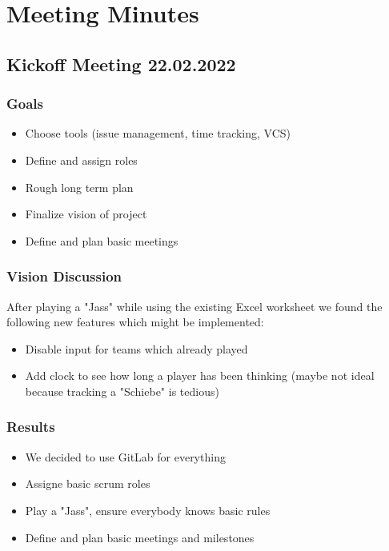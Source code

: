 \chapter{Meeting Minutes}

\section{Kickoff Meeting 22.02.2022}

\subsection{Goals}
\begin{itemize}
    \item Choose tools (issue management, time tracking, VCS)
    \item Define and assign roles
    \item Rough long term plan
    \item Finalize vision of project
    \item Define and plan basic meetings
\end{itemize}

\subsection{Vision Discussion}

After playing a "Jass" while using the existing Excel worksheet we found the following new features which might be implemented:

\begin{itemize}
    \item Disable input for teams which already played
    \item Add clock to see how long a player has been thinking (maybe not ideal because tracking a "Schiebe" is tedious)
\end{itemize}

\subsection{Results}
\begin{itemize}
    \item We decided to use GitLab for everything
    \item Assigne basic scrum roles
    \item Play a "Jass", ensure everybody knows basic rules
    \item Define and plan basic meetings and milestones
\end{itemize}

